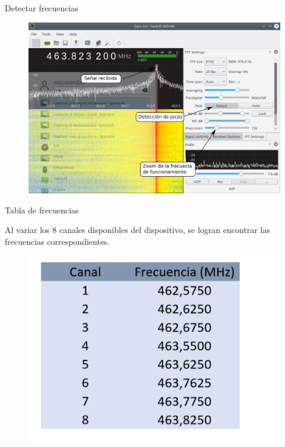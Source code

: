 \begin{frame}{Detectar frecuencias}

\begin{figure}[H]
\centering
\vspace{-3mm}
\includegraphics[width=\textwidth]{parte3/lab10/pdf/lab10_5.pdf}
\end{figure}

\end{frame}

\begin{frame}{Tabla de frecuencias}

Al variar los 8 canales disponibles del dispositivo, se logran encontrar las frecuencias correspondientes.

\begin{figure}[H]
\centering
\vspace{-3mm}
\includegraphics[width=.8\textwidth]{parte3/lab10/pdf/lab10_6.pdf}
\end{figure}

\end{frame}

